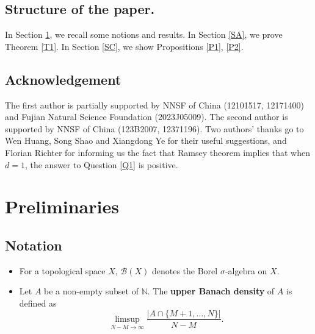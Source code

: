 \documentclass[reqno,12pt]{amsart}
\def \N {\mathbb N}
\def \C {\mathbb C}
\def \Z {\mathbb Z}
\def \R {\mathbb R}
\def \Q {\mathbb Q}
\numberwithin{equation}{section}
\begin{document}
\subsection*{Structure of the paper.} In Section \ref{SP}, we recall some notions and results. In Section \ref{SA}, we prove Theorem \ref{T1}. In Section \ref{SC}, we show Propositions \ref{P1}, \ref{P2}. 
\subsection*{Acknowledgement}
The first author is partially supported by NNSF of China (12101517, 12171400) and Fujian Natural Science Foundation (2023J05009). The second author is supported by NNSF of China (123B2007, 12371196). Two authors' thanks go to Wen Huang, Song Shao and  Xiangdong Ye for their useful suggestions, and Florian Richter for informing us the fact that Ramsey theorem implies that when $d=1$, the answer to Question \ref{Q1} is positive.
\section{Preliminaries}\label{SP}
\subsection{Notation}
\begin{itemize}
	\item For a topological space $X$, $\mathcal{B}(X)$ denotes the Borel $\sigma$-algebra on $X$.
	\item Let $A$ be a non-empty subset of $\N$. The \textbf{upper Banach density} of $A$ is defined as $$\limsup_{N-M\to\infty}\frac{|A\cap \{M+1,\ldots,N\}|}{N-M}.$$
\end{itemize}
\end{document}
